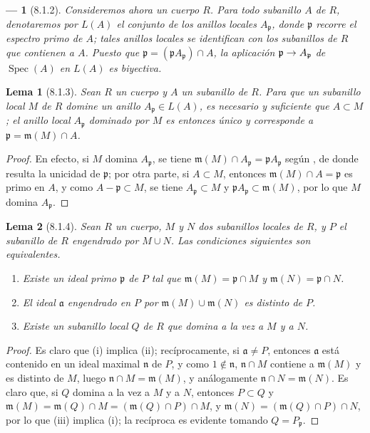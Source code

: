 \documentclass[oneside]{amsart}
\theoremstyle{ega-env-style}
\newtheorem*{env}{---}
\theoremstyle{ega-thm-env-style}
\newtheorem*{lemma}{Lema}
\theoremstyle{ega-defn-env-style}
\def\setmin{-}                      %
\renewcommand{\to}{\mathchoice{\longrightarrow}{\rightarrow}{\rightarrow}{\rightarrow}}
\newcommand{\oldpage}[2][]{{\marginnote{\normalfont{\textbf{#1}~|~#2}}}\ignorespaces}
\let\EGAOriginalLabel\label
\renewcommand{\label}[1]{\phantomsection\EGAOriginalLabel{#1}}
\begin{document}
\begin{env}[8.1.2]
\label{I.8.1.2}
Consideremos ahora un \emph{cuerpo} $R$.
Para todo subanillo $A$ de $R$, denotaremos por $L(A)$ el conjunto de los anillos locales $A_\mathfrak p$, donde $\mathfrak p$ recorre el espectro primo de $A$;
tales anillos locales se identifican con los subanillos de $R$ que contienen a $A$.
Puesto que $\mathfrak p=(\mathfrak p A_\mathfrak p)\cap A$, la aplicación $\mathfrak p\to A_\mathfrak p$ de $\operatorname{Spec}(A)$ en $L(A)$ es biyectiva.
\end{env}

\begin{lemma}[8.1.3]
\label{I.8.1.3}
Sean $R$ un cuerpo y $A$ un subanillo de $R$.
Para que un subanillo local $M$ de $R$ domine un anillo $A_\mathfrak p\in L(A)$, es necesario y suficiente que $A\subset M$;
el anillo local $A_\mathfrak p$ dominado por $M$ es entonces único y corresponde a $\mathfrak p=\mathfrak m(M)\cap A$.
\end{lemma}

\begin{proof}
En efecto, si $M$ domina $A_\mathfrak p$, se tiene $\mathfrak m(M)\cap A_\mathfrak p=\mathfrak p A_\mathfrak p$ según , de donde resulta la unicidad de $\mathfrak p$;
por otra parte, si $A\subset M$, entonces $\mathfrak m(M)\cap A=\mathfrak p$ es primo en $A$, y como $A\setmin\mathfrak p\subset M$, se tiene $A_\mathfrak p\subset M$ y $\mathfrak p A_\mathfrak p\subset\mathfrak m(M)$, por lo que $M$ domina $A_\mathfrak p$.
\end{proof}

\oldpage[I]{165}
\begin{lemma}[8.1.4]
\label{I.8.1.4}
Sean $R$ un cuerpo, $M$ y $N$ dos subanillos locales de $R$, y $P$ el subanillo de $R$ engendrado por $M\cup N$.
Las condiciones siguientes son equivalentes.
\begin{enumerate}
  \item[{\rm(i)}] Existe un ideal primo $\mathfrak p$ de $P$ tal que $\mathfrak m(M)=\mathfrak p\cap M$ y $\mathfrak m(N)=\mathfrak p\cap N$.
  \item[{\rm(ii)}] El ideal $\mathfrak a$ engendrado en $P$ por $\mathfrak m(M)\cup\mathfrak m(N)$ es distinto de $P$.
  \item[{\rm(iii)}] Existe un subanillo local $Q$ de $R$ que domina a la vez a $M$ y a $N$.
\end{enumerate}
\end{lemma}

\begin{proof}
Es claro que (i) implica (ii);
recíprocamente, si $\mathfrak a\ne P$, entonces $\mathfrak a$ está contenido en un ideal maximal $\mathfrak n$ de $P$, y como $1\notin\mathfrak n$, $\mathfrak n\cap M$ contiene a $\mathfrak m(M)$ y es distinto de $M$, luego $\mathfrak n\cap M=\mathfrak m(M)$, y análogamente $\mathfrak n\cap N=\mathfrak m(N)$.
Es claro que, si $Q$ domina a la vez a $M$ y a $N$, entonces $P\subset Q$ y $\mathfrak m(M)=\mathfrak m(Q)\cap M=(\mathfrak m(Q)\cap P)\cap M$, y $\mathfrak m(N)=(\mathfrak m(Q)\cap P)\cap N$, por lo que (iii) implica (i);
la recíproca es evidente tomando $Q=P_\mathfrak p$.
\end{proof}
\end{document}
